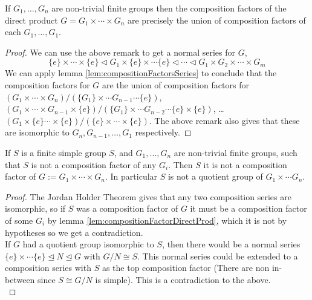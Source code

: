 \begin{lemma} \label{lem:compositionFactorDirectProd}
If $G_1, \ldots , G_n$ are non-trivial finite groups then the composition factors of the direct product $G = G_1 \times \cdots \times G_n$ are precisely the union of composition factors of each $G_1, \ldots , G_1$.
\end{lemma}
\begin{proof}
We can use the above remark to get a normal series for $G$, 
$$\{e\} \times \cdots \times \{e\} \vartriangleleft G_1 \times \{e\} \times \cdots \{e\} \vartriangleleft \cdots \vartriangleleft G_1 \times G_2 \times \cdots \times G_m$$
We can apply lemma \ref{lem:compositionFactorsSeries} to conclude that the composition factors for $G$ are the union of composition factors for $(G_1\times \cdots \times G_n)/(\{G_1\} \times \cdots G_{n-1} \cdots \{e\})$, $(G_1 \times \cdots \times G_{n-1} \times \{e\})/(\{G_1\} \times \cdots G_{n-2} \cdots \{e\} \times \{e\})$, \ldots $(G_1 \times \{e\} \cdots \times \{e\})/(\{e\} \times \cdots \times \{e\})$. The above remark also gives that these are isomorphic to $G_n, G_{n-1}, \ldots, G_1 $ respectively. \myqed

\end{proof}  

\begin{lemma}\label{lem:notQuotientDirectProd}
If $S$ is a finite simple group $S$, and $G_1, \ldots , G_n$ are non-trivial finite groups, such that $S$ is not a composition factor of any $G_i$. Then $S$ it is not a composition factor of $G := G_1 \times \cdots \times G_n$. In particular $S$ is not a quotient group of $G_1 \times \cdots G_n$. 
\end{lemma}
\begin{proof}
The Jordan Holder Theorem gives that any two composition series are isomorphic, so if $S$ was a composition factor of $G$ it must be a composition factor of some $G_i$ by lemma \ref{lem:compositionFactorDirectProd}, which it is not by hypotheses so we get a contradiction.\\
If $G$ had a quotient group isomorphic to $S$, then there would be a normal series $\{e\} \times \cdots \{e\} \trianglelefteq N \trianglelefteq G$ with $G/ N \cong S$. This normal series could be extended to a composition series with $S$ as the top composition factor (There are non in-between since $S \cong G/N$ is simple). This is a contradiction to the above. \\
\end{proof}



